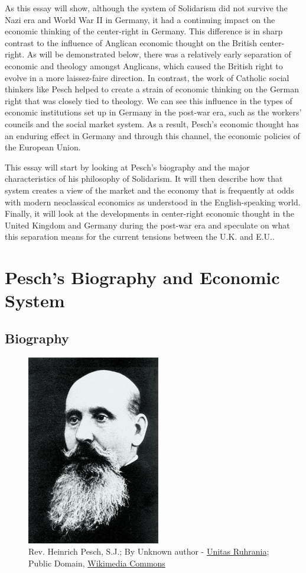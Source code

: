 \documentclass{article}
\begin{document}
As this essay will show, although the system of Solidarism did not survive the Nazi era and World War II in Germany, it had a continuing impact on the economic thinking of the center-right in Germany.  This difference is in sharp contrast to the influence of Anglican economic thought on the British center-right.  As will be demonstrated below, there was a relatively early separation of economic and theology amongst Anglicans, which caused the British right to evolve in a more laissez-faire direction.  In contrast, the work of Catholic social thinkers like Pesch helped to create a strain of economic thinking on the German right that was closely tied to theology.  We can see this influence in the types of economic institutions set up in Germany in the post-war era, such as the workers’ councils and the social market system.  As a result, Pesch’s economic thought has an enduring effect in Germany and through this channel, the economic policies of the European Union.\medskip

This essay will start by looking at Pesch’s biography and the major characteristics of his philosophy of Solidarism.  It will then describe how that system creates a view of the market and the economy that is frequently at odds with modern neoclassical economics as understood in the English-speaking world.  Finally, it will look at the developments in center-right economic thought in the United Kingdom and Germany during the post-war era and speculate on what this separation means for the current tensions between the U.K. and E.U..

\section{Pesch's Biography and Economic System}

\subsection{Biography}

\begin{figure}
    \centering
    \includegraphics{Heinrich_Pesch.jpg}
    \caption{Rev. Heinrich Pesch, S.J.;
        By Unknown author - \href{http://www.unitas-ruhrania.org/index.php?section=news&amp;cmd=details&amp;newsid=1170}{Unitas Ruhrania}; Public Domain, \href{https://commons.wikimedia.org/w/index.php?curid=25140631}{Wikimedia Commons}
    }
    \label{fig:peschphoto}
\end{figure}
\end{document}
